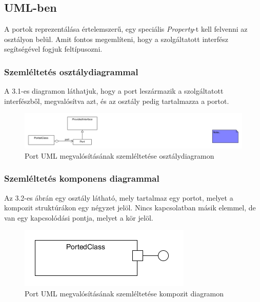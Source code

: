 \documentclass[a4paper,12pt]{report}
\begin{document}
\subsection{UML-ben}
A portok reprezentálása értelemszerű, egy speciális \textit{Property}-t kell felvenni az osztályon belül. Amit fontos megemlíteni, hogy a szolgáltatott interfész segítségével fogjuk feltípusozni. 


\subsubsection{Szemléltetés osztálydiagrammal}
A 3.1-es diagramon láthatjuk, hogy a port leszármazik a szolgáltatott interfészből, megvalósítva azt, és az osztály pedig tartalmazza a portot.

\begin{figure}[H]
\begin{center}
\includegraphics[scale=0.8]{uml_port_class.png}
\end{center}
\caption{Port UML megvalósításának szemléltetése osztálydiagramon}
\end{figure}

\subsubsection{Szemléltetés komponens diagrammal}
Az 3.2-es ábrán egy osztály látható, mely tartalmaz egy portot, melyet a kompozit struktúrákon egy négyzet jelöl. Nincs kapcsolatban másik elemmel, de van egy kapcsolódási pontja, melyet a kör jelöl. \\
\begin{figure}[H]
\begin{center}
\includegraphics[scale=0.7]{uml_port_comp.png}
\end{center}
\caption{Port UML megvalósításának szemléltetése kompozit diagramon}
\end{figure}
\end{document}
